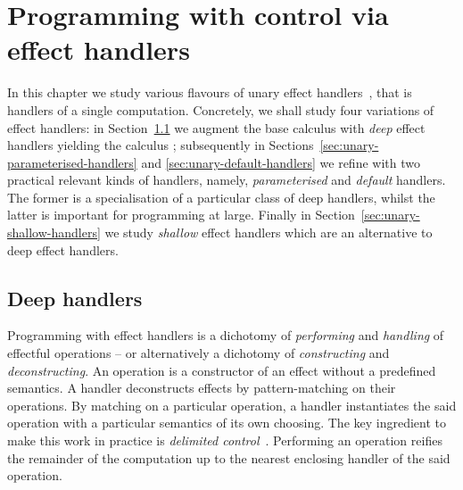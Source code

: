 \documentclass[12pt,phd,lfcs,twoside,openright,logo,leftchapter,normalheadings]{infthesis}
\theoremstyle{plain}
\theoremstyle{definition}
\begin{document}
\chapter{Programming with control via effect handlers}
\label{ch:unary-handlers}
%
In this chapter we study various flavours of unary effect
handlers~\cite{PlotkinP13}, that is handlers of a single
computation. Concretely, we shall study four variations of effect
handlers: in Section~\ref{sec:unary-deep-handlers} we augment the base
calculus \BCalc{} with \emph{deep} effect handlers yielding the
calculus \HCalc{}; subsequently in
Sections~\ref{sec:unary-parameterised-handlers} and
\ref{sec:unary-default-handlers} we refine \HCalc{} with two practical
relevant kinds of handlers, namely, \emph{parameterised} and
\emph{default} handlers. The former is a specialisation of a
particular class of deep handlers, whilst the latter is important for
programming at large. Finally in
Section~\ref{sec:unary-shallow-handlers} we study \emph{shallow}
effect handlers which are an alternative to deep effect handlers.



\section{Deep handlers}
\label{sec:unary-deep-handlers}
%
Programming with effect handlers is a dichotomy of \emph{performing}
and \emph{handling} of effectful operations -- or alternatively a
dichotomy of \emph{constructing} and \emph{deconstructing}. An operation
is a constructor of an effect without a predefined semantics. A
handler deconstructs effects by pattern-matching on their operations. By
matching on a particular operation, a handler instantiates the said
operation with a particular semantics of its own choosing. The key
ingredient to make this work in practice is \emph{delimited
  control}~\cite{Landin65,Landin65a,Landin98,FelleisenF86,DanvyF90}. Performing
an operation reifies the remainder of the computation up to the
nearest enclosing handler of the said operation.
\end{document}
